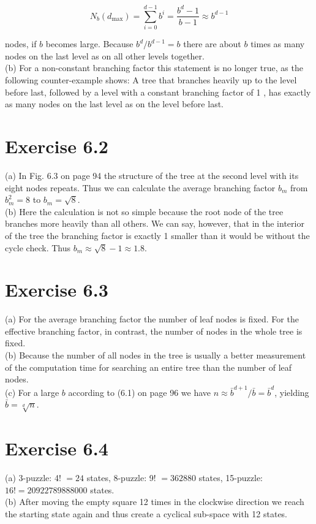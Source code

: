 \documentclass[10pt]{book}
\begin{document}
$$
N_{b}\left(d_{\max }\right)=\sum_{i=0}^{d-1} b^{i}=\frac{b^{d}-1}{b-1} \approx b^{d-1}
$$

nodes, if $b$ becomes large. Because $b^{d} / b^{d-1}=b$ there are about $b$ times as many nodes on the last level as on all other levels together.\\
(b) For a non-constant branching factor this statement is no longer true, as the following counter-example shows: A tree that branches heavily up to the level before last, followed by a level with a constant branching factor of 1 , has exactly as many nodes on the last level as on the level before last.

\section{Exercise 6.2}
(a) In Fig. 6.3 on page 94 the structure of the tree at the second level with its eight nodes repeats. Thus we can calculate the average branching factor $b_{m}$ from $b_{m}^{2}=8$ to $b_{m}=\sqrt{8}$.\\
(b) Here the calculation is not so simple because the root node of the tree branches more heavily than all others. We can say, however, that in the interior of the tree the branching factor is exactly 1 smaller than it would be without the cycle check. Thus $b_{m} \approx \sqrt{8}-1 \approx 1.8$.

\section{Exercise 6.3}
(a) For the average branching factor the number of leaf nodes is fixed. For the effective branching factor, in contrast, the number of nodes in the whole tree is fixed.\\
(b) Because the number of all nodes in the tree is usually a better measurement of the computation time for searching an entire tree than the number of leaf nodes.\\
(c) For a large $b$ according to (6.1) on page 96 we have $n \approx \bar{b}^{d+1} / \bar{b}=\bar{b}^{d}$, yielding $\bar{b}=\sqrt[d]{n}$.

\section{Exercise 6.4}
(a) 3-puzzle: 4! $=24$ states, 8-puzzle: 9! $=362880$ states, 15-puzzle: $16!=20922789888000$ states.\\
(b) After moving the empty square 12 times in the clockwise direction we reach the starting state again and thus create a cyclical sub-space with 12 states.
\end{document}
